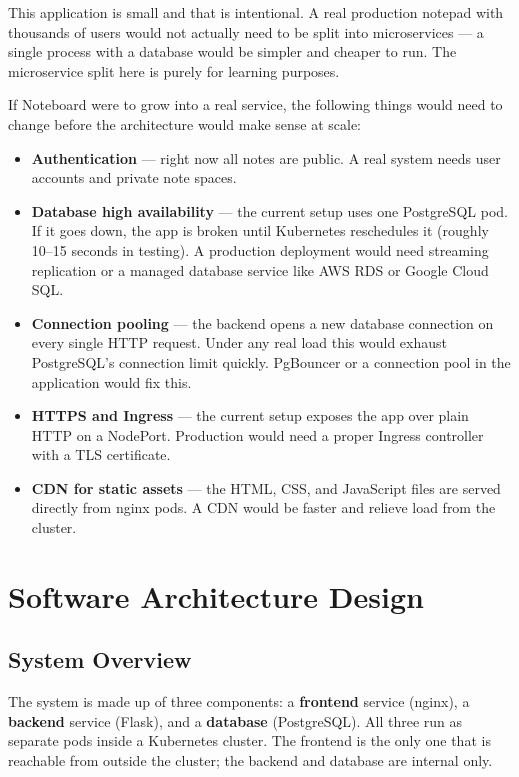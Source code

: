 \documentclass[12pt,a4paper]{article}
\begin{document}
This application is small and that is intentional. A real production notepad with thousands of users would not actually need to be split into microservices --- a single process with a database would be simpler and cheaper to run. The microservice split here is purely for learning purposes.

If Noteboard were to grow into a real service, the following things would need to change before the architecture would make sense at scale:

\begin{itemize}
    \item \textbf{Authentication} --- right now all notes are public. A real system needs user accounts and private note spaces.
    \item \textbf{Database high availability} --- the current setup uses one PostgreSQL pod. If it goes down, the app is broken until Kubernetes reschedules it (roughly 10--15 seconds in testing). A production deployment would need streaming replication or a managed database service like AWS RDS or Google Cloud SQL.
    \item \textbf{Connection pooling} --- the backend opens a new database connection on every single HTTP request. Under any real load this would exhaust PostgreSQL's connection limit quickly. PgBouncer or a connection pool in the application would fix this.
    \item \textbf{HTTPS and Ingress} --- the current setup exposes the app over plain HTTP on a NodePort. Production would need a proper Ingress controller with a TLS certificate.
    \item \textbf{CDN for static assets} --- the HTML, CSS, and JavaScript files are served directly from nginx pods. A CDN would be faster and relieve load from the cluster.
\end{itemize}

\section{Software Architecture Design}

\subsection{System Overview}

The system is made up of three components: a \textbf{frontend} service (nginx), a \textbf{backend} service (Flask), and a \textbf{database} (PostgreSQL). All three run as separate pods inside a Kubernetes cluster. The frontend is the only one that is reachable from outside the cluster; the backend and database are internal only.
\end{document}
